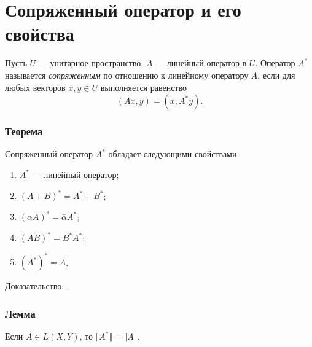 \section{Сопряженный оператор и его свойства}
\label{sec:q-27}

Пусть $U$ --- унитарное пространство, $A$ --- линейный оператор в $U$. Оператор $A^*$ называется \textit{сопряженным} по отношению к линейному оператору $A$, если для любых векторов $x, y \in U$ выполняется равенство
$$(Ax, y) = (x, A^*y).$$

\subsubsection*{Теорема}
Сопряженный оператор $A^*$ обладает следующими свойствами:
\begin{enumerate}
	\itemsep0pt
	\item $A^*$ --- линейный оператор;
	\item $(A + B)^* = A^* + B^*$;
	\item $(\alpha A)^* = \bar{\alpha}A^*$;
	\item $(AB)^* = B^*A^*$; 
	\item $(A^*)^* = A$.
\end{enumerate}
Доказательство: \cite[с.~1]{adjoint-operator}.

\subsubsection*{Лемма}
Если $A \in L(X, Y)$, то $\Vert A^* \Vert = \Vert A \Vert$\cite[с.~179]{trenogin}.